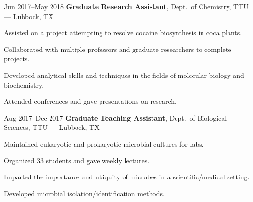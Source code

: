 \documentclass{resume}
\begin{document}
        \begin{twocolentry}{Jun 2017--May 2018}
            \textbf{Graduate Research Assistant}, Dept.\ of Chemistry, TTU --- Lubbock, TX
        \end{twocolentry}
        \vspace{0.10cm}
        \begin{onecolentry}
            \begin{highlights}
                \item Assisted on a project attempting to resolve cocaine biosynthesis in coca plants.
                \item Collaborated with multiple professors and graduate researchers to complete projects.
                \item Developed analytical skills and techniques in the fields of molecular biology and biochemistry.
                \item Attended conferences and gave presentations on research.
            \end{highlights}
        \end{onecolentry}
        \vspace{0.2cm}

        \begin{twocolentry}{Aug 2017--Dec 2017}
            \textbf{Graduate Teaching Assistant}, Dept.\ of Biological Sciences, TTU --- Lubbock, TX
        \end{twocolentry}
        \vspace{0.10cm}
        \begin{onecolentry}
            \begin{highlights}
                \item Maintained eukaryotic and prokaryotic microbial cultures for labs.
                \item Organized 33 students and gave weekly lectures.
                \item Imparted the importance and ubiquity of microbes in a scientific/medical setting.
                \item Developed microbial isolation/identification methods.
            \end{highlights}
        \end{onecolentry}
        \vspace{0.2cm}
\end{document}
